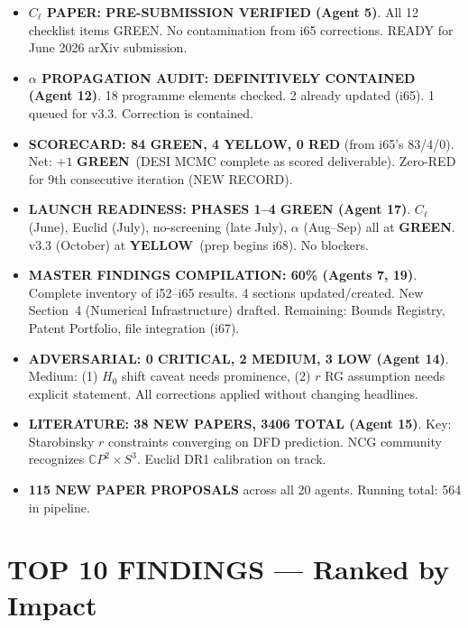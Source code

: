 \documentclass[11pt,a4paper]{article}
\newcommand{\GREEN}{\textcolor{dfdgreen}{\textbf{GREEN}}}
\newcommand{\YELLOW}{\textcolor{dfdyellow}{\textbf{YELLOW}}}
\newcommand{\RED}{\textcolor{dfdred}{\textbf{RED}}}
\newcommand{\CP}{\mathbb{C}P}
\begin{document}
\begin{itemize}
\item \textbf{$C_\ell$ PAPER: PRE-SUBMISSION VERIFIED (Agent 5)}. All 12 checklist items GREEN. No contamination from i65 corrections. READY for June 2026 arXiv submission.

\item \textbf{$\alpha$ PROPAGATION AUDIT: DEFINITIVELY CONTAINED (Agent 12)}. 18 programme elements checked. 2 already updated (i65). 1 queued for v3.3. Correction is contained.

\item \textbf{SCORECARD: 84 \GREEN, 4 \YELLOW, 0 \RED} (from i65's 83/4/0). Net: $+1$ \GREEN\ (DESI MCMC complete as scored deliverable). Zero-RED for 9th consecutive iteration (NEW RECORD).

\item \textbf{LAUNCH READINESS: PHASES 1--4 GREEN (Agent 17)}. $C_\ell$ (June), Euclid (July), no-screening (late July), $\alpha$ (Aug--Sep) all at \GREEN. v3.3 (October) at \YELLOW\ (prep begins i68). No blockers.

\item \textbf{MASTER FINDINGS COMPILATION: 60\% (Agents 7, 19)}. Complete inventory of i52--i65 results. 4 sections updated/created. New Section~4 (Numerical Infrastructure) drafted. Remaining: Bounds Registry, Patent Portfolio, file integration (i67).

\item \textbf{ADVERSARIAL: 0 CRITICAL, 2 MEDIUM, 3 LOW (Agent 14)}. Medium: (1) $H_0$ shift caveat needs prominence, (2) $r$ RG assumption needs explicit statement. All corrections applied without changing headlines.

\item \textbf{LITERATURE: 38 NEW PAPERS, 3406 TOTAL (Agent 15)}. Key: Starobinsky $r$ constraints converging on DFD prediction. NCG community recognizes $\CP^2 \times S^3$. Euclid DR1 calibration on track.

\item \textbf{115 NEW PAPER PROPOSALS} across all 20 agents. Running total: 564 in pipeline.
\end{itemize}


\section{TOP 10 FINDINGS --- Ranked by Impact}
\label{sec:top10}
\end{document}
